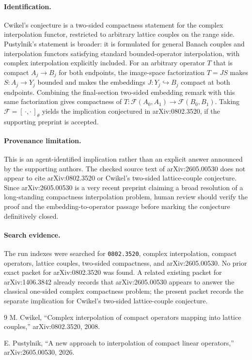 \documentclass[11pt]{article}
\begin{document}
\paragraph{Identification.}
Cwikel's conjecture is a two-sided compactness statement for the complex
interpolation functor, restricted to arbitrary lattice couples on the range
side. Pustylnik's statement is broader: it is formulated for general Banach
couples and interpolation functors satisfying standard bounded-operator
interpolation, with complex interpolation explicitly included. For an
arbitrary operator \(T\) that is compact \(A_j\to B_j\) for both endpoints,
the image-space factorization \(T=JS\) makes \(S:A_j\to Y_j\) bounded and
makes the embeddings \(J:Y_j\hookrightarrow B_j\) compact at both endpoints.
Combining the final-section two-sided embedding remark with this same
factorization gives compactness of \(T:\mathcal F(A_0,A_1)\to
\mathcal F(B_0,B_1)\). Taking \(\mathcal F=[\,\cdot,\cdot\,]_\theta\) yields
the implication conjectured in arXiv:0802.3520, if the supporting preprint is
accepted.

\paragraph{Provenance limitation.}
This is an agent-identified implication rather than an explicit answer
announced by the supporting authors. The checked source text of
arXiv:2605.00530 does not appear to cite arXiv:0802.3520 or Cwikel's
two-sided lattice-couple conjecture. Since arXiv:2605.00530 is a very recent
preprint claiming a broad resolution of a long-standing compactness
interpolation problem, human review should verify the proof and the
embedding-to-operator passage before marking the conjecture definitively
closed.

\paragraph{Search evidence.}
The run indexes were searched for \texttt{0802.3520}, complex interpolation,
compact operators, lattice couples, two-sided compactness, and
arXiv:2605.00530. No prior exact packet for arXiv:0802.3520 was found. A
related existing packet for arXiv:1406.3842 already records that
arXiv:2605.00530 appears to answer the classical one-sided complex
compactness problem; the present packet records the separate implication for
Cwikel's two-sided lattice-couple conjecture.

\begin{thebibliography}{9}
M. Cwikel,
``Complex interpolation of compact operators mapping into lattice couples,''
arXiv:0802.3520, 2008.

E. Pustylnik,
``A new approach to interpolation of compact linear operators,''
arXiv:2605.00530, 2026.
\end{thebibliography}
\end{document}
